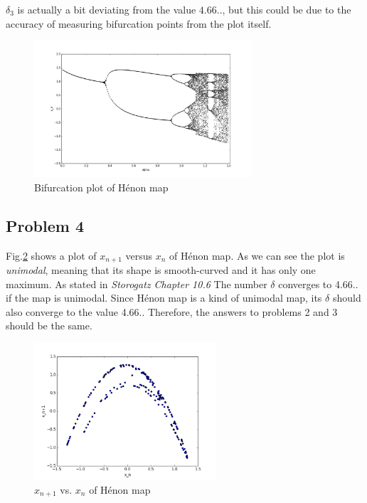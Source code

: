 \documentclass{article}
\begin{document}
$\delta_{3}$ is actually a bit deviating from the value $4.66..$, but this could be due to the accuracy of measuring bifurcation points from the plot itself. 

\begin{figure}[hb]
	\centering
	\includegraphics[height=2in]{figs/fig3.png}
	\caption{Bifurcation plot of H\'enon map}
	\label{Henon}
\end{figure}

\subsection*{Problem 4}
Fig.\ref{3} shows a plot of $x_{n+1}$ versus $x_{n}$ of H\'enon map. As we can see the plot is \textit{unimodal}, meaning that its shape is smooth-curved and it has only one maximum. As stated in \textit{Storogatz Chapter 10.6} The number $\delta$ converges to 4.66.. if the map is unimodal. Since H\'enon map is a kind of unimodal map, its $\delta$ should also converge to the value 4.66.. Therefore, the answers to problems 2 and 3 should be the same.
\begin{figure}[hb]
	\centering
	\includegraphics[height=2in]{figs/fig4.png}
	\caption{$x_{n+1}$ vs. $x_{n}$ of H\'enon map}
	\label{3}
\end{figure}
\end{document}
